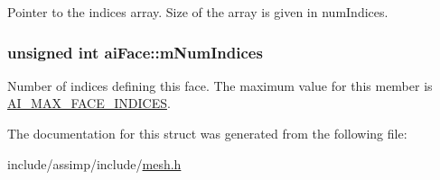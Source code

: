 Pointer to the indices array. Size of the array is given in num\-Indices. 

\hypertarget{structai_face_adda2698cec0ebfe651572f4a5701360b}{
\subsubsection[{m\-Num\-Indices}]{\setlength{\rightskip}{0pt plus 5cm}unsigned {\bf int} ai\-Face\-::m\-Num\-Indices}}\label{structai_face_adda2698cec0ebfe651572f4a5701360b}
Number of indices defining this face. The maximum value for this member is \hyperlink{mesh_8h_a380f3ab069e89b3a1ed975577600438b}{A\-I\-\_\-\-M\-A\-X\-\_\-\-F\-A\-C\-E\-\_\-\-I\-N\-D\-I\-C\-E\-S}. 

The documentation for this struct was generated from the following file\-:\begin{DoxyCompactItemize}
\item 
include/assimp/include/\hyperlink{mesh_8h}{mesh.\-h}\end{DoxyCompactItemize}
